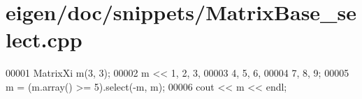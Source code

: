 \hypertarget{eigen_2doc_2snippets_2_matrix_base__select_8cpp_source}{}\section{eigen/doc/snippets/\+Matrix\+Base\+\_\+select.cpp}
\label{eigen_2doc_2snippets_2_matrix_base__select_8cpp_source}

\begin{DoxyCode}
00001 MatrixXi m(3, 3);
00002 m << 1, 2, 3,
00003      4, 5, 6,
00004      7, 8, 9;
00005 m = (m.array() >= 5).select(-m, m);
00006 cout << m << endl;
\end{DoxyCode}
